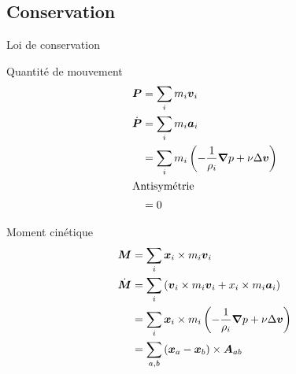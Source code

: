 \subsection{Conservation}
\begin{frame}[<+->][shrink]{Loi de conservation}
\begin{block}{Quantité de mouvement}
 \begin{align*}
  {\boldsymbol {P}}&=\sum_{i} m_i{\boldsymbol {v}}_{i}\\
  \dot{{\boldsymbol {P}}}&=\sum_{i} m_i{\boldsymbol {a}}_{i}\\
  &=\sum_{i}m_{i} \left(-\frac{1}{\rho_{i}}{\boldsymbol {\nabla}} p+\nu \Delta {\boldsymbol {v}}\right)\\
  \intertext{Antisymétrie}
  &=0
 \end{align*}

\end{block}

\begin{block}{Moment cinétique}
 \begin{align*}
  {\boldsymbol {M}}&=\sum_{i}{\boldsymbol {x}}_{i}\times m_{i}{\boldsymbol {v}}_{i}\\
  \dot{{\boldsymbol {M}}}&=\sum_{i}\left({\boldsymbol {v}}_{i}\times m_{i}{\boldsymbol {v}}_{i}+x_{i}\times m_{i}{\boldsymbol {a}}_{i}\right)\\
  &=\sum_{i}{\boldsymbol {x}}_{i}\times m_{i}\left(-\frac{1}{\rho_{i}}{\boldsymbol {\nabla}} p+\nu \Delta {\boldsymbol {v}}\right)\\
  &=\sum_{a,b}\left({\boldsymbol {x}}_{a}-{\boldsymbol {x}}_{b}\right)\times {\boldsymbol {A}}_{ab}
 \end{align*}

\end{block}

 
\end{frame}
